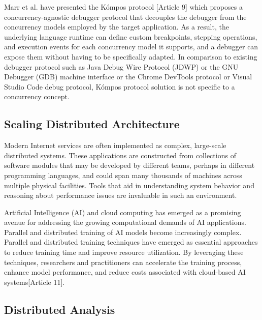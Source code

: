 Marr et al. have presented the Kómpos protocol [Article 9] which proposes a concurrency-agnostic debugger protocol that decouples the debugger from the concurrency models employed by the target application. As a result, the underlying language runtime can define custom breakpoints, stepping operations, and execution events for each concurrency model it supports, and a debugger can expose them without having to be specifically adapted. In comparison to existing debugger protocol such as Java Debug Wire Protocol (JDWP) or the GNU Debugger (GDB) machine interface or the Chrome DevTools protocol or Visual Studio Code debug protocol, Kómpos protocol solution is not specific to a concurrency concept.

\subsection{Scaling Distributed Architecture}

Modern Internet services are often implemented as complex, large-scale distributed systems. These applications are constructed from collections of software modules that may be developed by different teams, perhaps in different programming languages, and could span many thousands of machines across multiple physical facilities. Tools that aid in understanding system behavior and reasoning about performance issues are invaluable in such an environment.

Artificial Intelligence (AI) and cloud computing has emerged as a promising avenue for addressing the growing computational demands of AI applications. Parallel and distributed training of AI models become increasingly complex. Parallel and distributed training techniques have emerged as essential approaches to reduce training time and improve resource utilization. By leveraging these techniques, researchers and practitioners can accelerate the training process, enhance model performance, and reduce costs associated with cloud-based AI systems[Article 11].





\subsection{Distributed Analysis}

